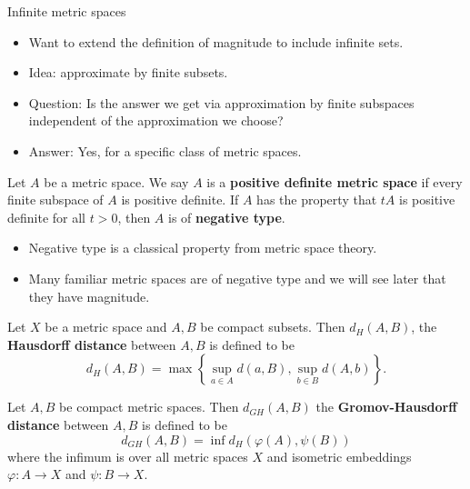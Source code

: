 \documentclass[12pt]{beamer}
\begin{document}
\begin{frame}[allowframebreaks]{Infinite metric spaces}
\begin{itemize}
\item Want to extend the definition of magnitude to include infinite sets.
\item Idea: approximate by finite subsets.
\item Question: Is the answer we get via approximation by finite subspaces independent of the approximation we choose?
\item Answer: Yes, for a specific class of metric spaces.
\end{itemize}

\framebreak

\begin{definition}
Let $A$ be a metric space. We say $A$ is a \textbf{positive definite metric space} if every finite subspace of $A$ is positive definite. If $A$ has the property that $tA$ is positive definite for all $t > 0$, then $A$ is of \textbf{negative type}.
\end{definition}

\begin{itemize}
\item Negative type is a classical property from metric space theory.
\item Many familiar metric spaces are of negative type and we will see later that they have magnitude.
\end{itemize}

\framebreak

\begin{definition}
Let $X$ be a metric space and $A,B$ be compact subsets. Then $d_H(A,B)$, the \textbf{Hausdorff distance} between $A,B$ is defined to be
\begin{equation*}
d_H(A,B) = \max\left\{\sup\limits_{a \in A} d(a,B), \sup\limits_{b \in B} d(A,b)\right\}.
\end{equation*}
\end{definition}

\framebreak

\begin{definition}
Let $A,B$ be compact metric spaces. Then $d_{GH}(A,B)$ the \textbf{Gromov-Hausdorff distance} between $A,B$ is defined to be
\begin{equation*}
d_{GH}(A,B) = \inf d_H(\varphi(A),\psi(B))
\end{equation*}
where the infimum is over all metric spaces $X$ and isometric embeddings $\varphi: A \to X$ and $\psi: B \to X$.
\end{definition}


\end{frame}
\end{document}
